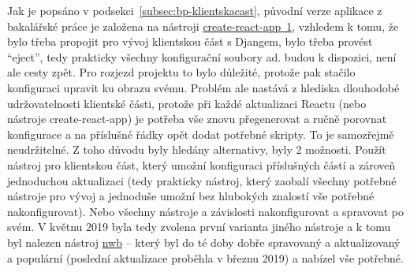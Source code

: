 Jak je popsáno v podsekci~\ref{subsec:bp-klientskacast}, původní verze aplikace z bakalářské práce je založena na nástroji \href{https://github.com/facebook/create-react-app}{create-react-app~1}, vzhledem k tomu, že bylo třeba propojit pro vývoj klientskou část s Djangem, bylo třeba provést \enquote{eject}, tedy prakticky všechny konfigurační soubory ad. budou k dispozici, není ale cesty zpět. Pro rozjezd projektu to bylo důležité, protože pak stačilo konfiguraci upravit ku obrazu svému. Problém ale nastává z hlediska dlouhodobé udržovatelnosti klientské části, protože při každé aktualizaci Reactu (nebo nástroje create-react-app) je potřeba vše znovu přegenerovat a ručně porovnat konfigurace a na příslušné řádky opět dodat potřebné skripty. To je samozřejmě neudržitelné. Z toho důvodu byly hledány alternativy, byly 2 možnosti. Použít nástroj pro klientskou část, který umožní konfiguraci příslušných částí a zároveň jednoduchou aktualizaci (tedy prakticky nástroj, který zaobalí všechny potřebné nástroje pro vývoj a jednoduše umožní bez hlubokých znalostí vše potřebné nakonfigurovat). Nebo všechny nástroje a závislosti nakonfigurovat a spravovat po svém. V květnu 2019 byla tedy zvolena první varianta jiného nástroje a k tomu byl nalezen nástroj \href{https://github.com/insin/nwb}{nwb} -- který byl do té doby dobře spravovaný a aktualizovaný a populární (poslední aktualizace proběhla v březnu 2019) a nabízel vše potřebné.

